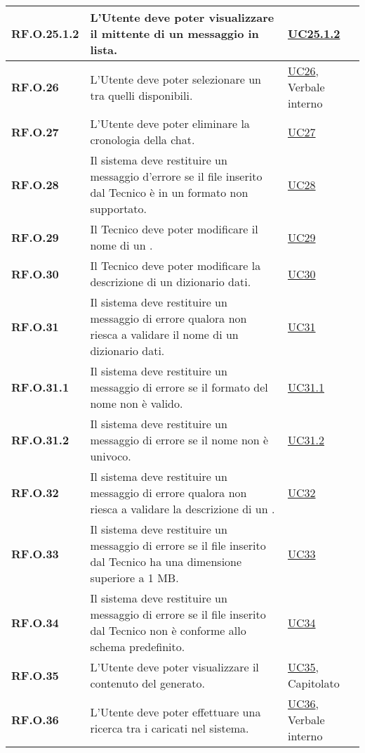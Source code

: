 \begin{adjustwidth}{-0.5cm}{-0.5cm}
\begin{longtable}{|P{3cm}|P{6,5cm}|>{\arraybackslash}P{4cm}|}
    \hline
    \textbf{RF.O.25.1.2} & L'Utente deve poter visualizzare il mittente di un messaggio in lista. &  \hyperref[UC25point1point2]{UC25.1.2}\\
    \hline
    \textbf{RF.O.26} & L'Utente deve poter selezionare un  tra quelli disponibili. & \hyperref[UC26]{UC26}, Verbale interno \\
    \hline
    \textbf{RF.O.27} & L'Utente deve poter eliminare la cronologia della chat. & \hyperref[UC27]{UC27} \\
    \hline
    \textbf{RF.O.28} & Il sistema deve restituire un messaggio d'errore se il file inserito dal Tecnico è in un formato non supportato. & \hyperref[UC28]{UC28} \\
    \hline
    \textbf{RF.O.29} & Il Tecnico deve poter modificare il nome di un . & \hyperref[UC29]{UC29} \\
    \hline
    \textbf{RF.O.30} & Il Tecnico deve poter modificare la descrizione di un dizionario dati. & \hyperref[UC30]{UC30} \\
    \hline
    \textbf{RF.O.31} & Il sistema deve restituire un messaggio di errore qualora non riesca a validare il nome di un dizionario dati. & \hyperref[UC31]{UC31} \\
    \hline
    \textbf{RF.O.31.1} & Il sistema deve restituire un messaggio di errore se il formato del nome non è valido. & \hyperref[UC31point1]{UC31.1} \\
    \hline
    \textbf{RF.O.31.2} & Il sistema deve restituire un messaggio di errore se il nome non è univoco. & \hyperref[UC31point2]{UC31.2} \\
    \hline
    \textbf{RF.O.32} & Il sistema deve restituire un messaggio di errore qualora non riesca a validare la descrizione di un . & \hyperref[UC32]{UC32} \\
    \hline
    \textbf{RF.O.33} & Il sistema deve restituire un messaggio di errore se il file inserito dal Tecnico ha una dimensione superiore a 1 MB. & \hyperref[UC33]{UC33} \\
    \hline
    \textbf{RF.O.34} & Il sistema deve restituire un messaggio di errore se il file inserito dal Tecnico non è conforme allo schema predefinito. & \hyperref[UC34]{UC34} \\
    \hline
    \textbf{RF.O.35} & L'Utente deve poter visualizzare il contenuto del  generato. & \hyperref[UC35]{UC35}, Capitolato \\
    \hline
    \textbf{RF.O.36} & L'Utente deve poter effettuare una ricerca tra i  caricati nel sistema. & \hyperref[UC36]{UC36}, Verbale interno \\

\end{longtable}
\end{adjustwidth}
